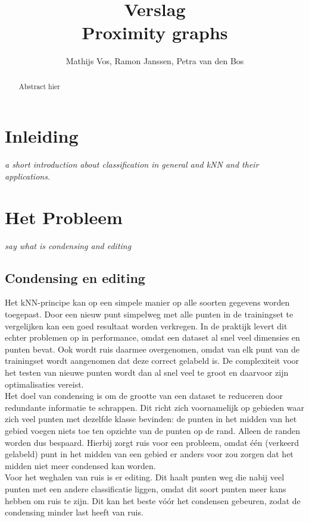 \documentclass{article}
\title{\Large Verslag \\ Proximity graphs}
\author{Mathijs Vos, Ramon Janssen, Petra van den Bos}
\begin{document}
\maketitle
\tableofcontents
\newpage

\begin{abstract}
Abstract hier
\end{abstract}

\section{Inleiding}
\emph{a short introduction about classification  in general and kNN and their applications.}\\

\section{Het Probleem}
\emph{say what is condensing and editing }\\
\subsection{Condensing en editing}

Het kNN-principe kan op een simpele manier op alle soorten gegevens worden toegepast. Door een nieuw punt simpelweg met alle punten in de trainingset te vergelijken kan een goed resultaat worden verkregen. In de praktijk levert dit echter problemen op in performance, omdat een dataset al snel veel dimensies en punten bevat. Ook wordt ruis daarmee overgenomen, omdat van elk punt van de trainingset wordt aangenomen dat deze correct gelabeld is. De complexiteit voor het testen van nieuwe punten wordt dan al snel veel te groot en daarvoor zijn optimalisaties vereist.\\

Het doel van condensing is om de grootte van een dataset te reduceren door redundante informatie te schrappen. Dit richt zich voornamelijk op gebieden waar zich veel punten met dezelfde klasse bevinden: de punten in het midden van het gebied voegen niets toe ten opzichte van de punten op de rand. Alleen de randen worden dus bespaard. Hierbij zorgt ruis voor een probleem, omdat één (verkeerd gelabeld) punt in het midden van een gebied er anders voor zou zorgen dat het midden niet meer condensed kan worden.\\
	
Voor het weghalen van ruis is er editing. Dit haalt punten weg die nabij veel punten met een andere classificatie liggen, omdat dit soort punten meer kans hebben om ruis te zijn. Dit kan het beste vóór het condensen gebeuren, zodat de condensing minder last heeft van ruis.\\
	
\end{document}
